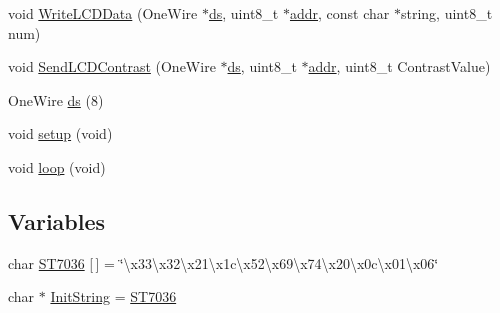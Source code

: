 \begin{DoxyCompactItemize}
\item 
void \hyperlink{backup_2v1_2Uno__DS2408__LCD163_8ino_aab2d9ea3e3ecace8e6d48c296ec9b622}{Write\-L\-C\-D\-Data} (One\-Wire $\ast$\hyperlink{OWRain1_8ino_af75456870b9486275b406e13b003fb11}{ds}, uint8\-\_\-t $\ast$\hyperlink{OWP__DG__1w-adaptor_8ino_a0fc5da2e63a94559429ec9aec32f1831}{addr}, const char $\ast$string, uint8\-\_\-t num)
\item 
void \hyperlink{backup_2v1_2Uno__DS2408__LCD163_8ino_a7e7f45f7deffa7054df42395788edf9c}{Send\-L\-C\-D\-Contrast} (One\-Wire $\ast$\hyperlink{OWRain1_8ino_af75456870b9486275b406e13b003fb11}{ds}, uint8\-\_\-t $\ast$\hyperlink{OWP__DG__1w-adaptor_8ino_a0fc5da2e63a94559429ec9aec32f1831}{addr}, uint8\-\_\-t Contrast\-Value)
\item 
One\-Wire \hyperlink{backup_2v1_2Uno__DS2408__LCD163_8ino_a7c78cdb37808e2d6d5aaab9ea7aca561}{ds} (8)
\item 
void \hyperlink{backup_2v1_2Uno__DS2408__LCD163_8ino_a7dfd9b79bc5a37d7df40207afbc5431f}{setup} (void)
\item 
void \hyperlink{backup_2v1_2Uno__DS2408__LCD163_8ino_a0b33edabd7f1c4e4a0bf32c67269be2f}{loop} (void)
\end{DoxyCompactItemize}
\subsection*{Variables}
\begin{DoxyCompactItemize}
\item 
char \hyperlink{backup_2v1_2Uno__DS2408__LCD163_8ino_a4db2cbb1ca779c9719d1a0f4d7ba5669}{S\-T7036} \mbox{[}$\,$\mbox{]} = \char`\"{}\textbackslash{}x33\textbackslash{}x32\textbackslash{}x21\textbackslash{}x1c\textbackslash{}x52\textbackslash{}x69\textbackslash{}x74\textbackslash{}x20\textbackslash{}x0c\textbackslash{}x01\textbackslash{}x06\char`\"{}
\item 
char $\ast$ \hyperlink{backup_2v1_2Uno__DS2408__LCD163_8ino_a62481bf733fae27fbf5f83e4a3582c1c}{Init\-String} = \hyperlink{Uno__DS2408__LCD163_8ino_a4db2cbb1ca779c9719d1a0f4d7ba5669}{S\-T7036}
\end{DoxyCompactItemize}



